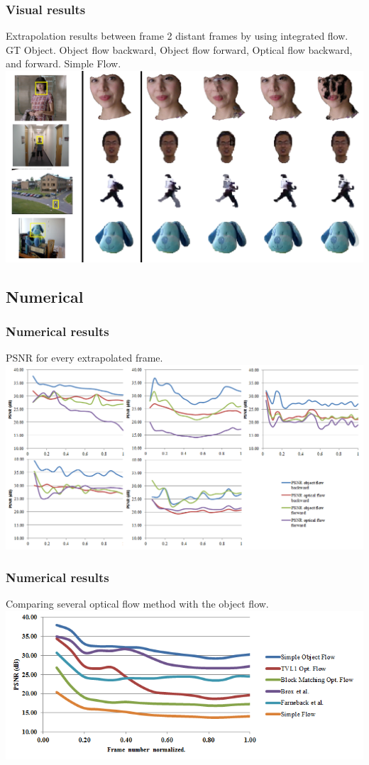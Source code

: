\documentclass{beamer}
\begin{document}
\begin{frame}
	\frametitle{Visual results}
	Extrapolation results between frame 2 distant frames by using 
	integrated flow.
	GT Object. Object flow backward, Object flow forward, Optical flow backward, and forward. Simple Flow.
\includegraphics[height=0.5\textheight]{../images/extrapolated.png}
\end{frame}

\subsection{Numerical}

\begin{frame}
	\frametitle{Numerical results}
	PSNR for every extrapolated frame.
\includegraphics[width=1.0\textwidth]{../images/psnr.png}
\end{frame}

\begin{frame}
	\frametitle{Numerical results}
	Comparing several optical flow method with the object flow.
\includegraphics[width=1.0\textwidth]{../images/psnr2.png}
\end{frame}
\end{document}
